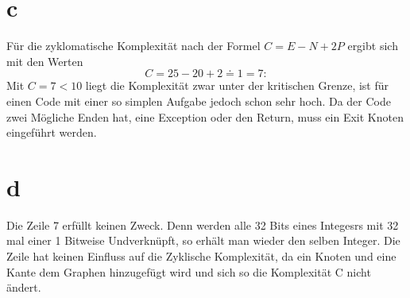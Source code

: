 \section*{c}
Für die zyklomatische Komplexität nach der Formel $ C=E-N+2P$ ergibt sich mit den Werten
\begin{equation}
	C= 25-20+2 \doteq 1 = 7:
\end{equation}
Mit $C=7<10$ liegt die Komplexität zwar unter der kritischen Grenze, ist für einen Code mit einer so simplen Aufgabe jedoch schon sehr hoch. 
Da der Code zwei Mögliche Enden hat, eine Exception oder den Return, muss ein Exit Knoten eingeführt werden.



%

\section*{d}
Die Zeile 7 erfüllt keinen Zweck. Denn werden alle 32 Bits eines Integesrs mit 32 mal einer 1 Bitweise Undverknüpft, so erhält man wieder den selben Integer.
Die Zeile hat keinen Einfluss auf die Zyklische Komplexität, da ein Knoten und eine Kante dem Graphen hinzugefügt wird und sich so die Komplexität C nicht ändert.